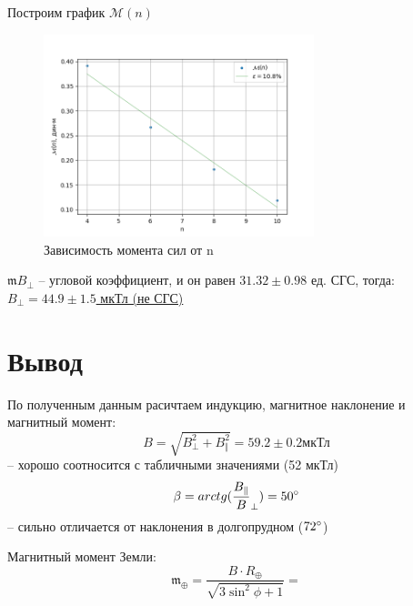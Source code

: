 \documentclass[12pt,a4paper]{article}
\newcommand{\mk}{\mathfrak}
\begin{document}
\begin{enumerate}
  Построим график $\mathcal{M}(n)$
  \begin{figure}[H]
    \includegraphics*[width=0.7\textwidth]{m(n).png}
    \caption{Зависимость момента сил от n}
  \end{figure}
  $\mk m B_\bot$ -- угловой коэффициент, и он равен $31.32 \pm 0.98$ ед. СГС, тогда: \\ \underline{$B_\bot = 44.9 \pm 
  1.5$ мкТл  (не СГС)}
\end{enumerate}


\newpage
\section*{Вывод}
По полученным данным  расичтаем индукцию, магнитное наклонение и магнитный момент:
$$B = \sqrt{B_\bot^2 + B_\Vert^2} = 59.2 \pm 0.2 \text{мкТл}$$ -- хорошо соотносится с табличными значениями (52 мкТл)
$$\beta = arctg(\frac{B_\Vert}B_\bot) = 50\degree$$ -- сильно отличается от наклонения в долгопрудном ($72\degree$)

Магнитный момент Земли:
$${\mk m}_\oplus=\frac{B\cdot R_\oplus}{\sqrt{3\sin ^2 \phi +1}} = $$
\end{document}
